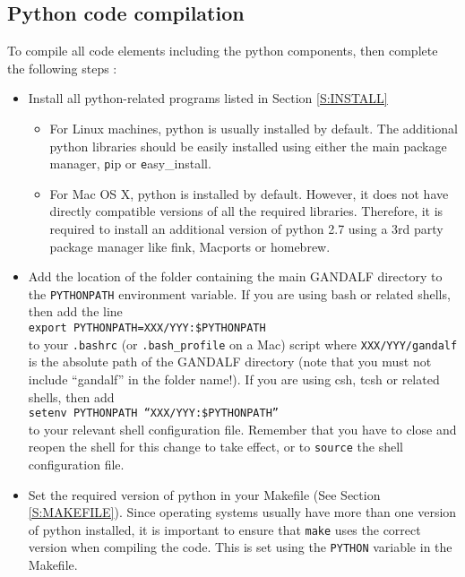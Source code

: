 \documentclass[a4paper]{article}
\newcommand{\var}[1]{\texttt{#1}}
\begin{document}
\subsection{Python code compilation}
To compile all code elements including the python components, then complete the following steps :
\begin{itemize}

\item Install all python-related programs listed in Section \ref{S:INSTALL}

\begin{itemize}
\item For Linux machines, python is usually installed by default.  The additional python libraries should be easily installed using either the main package manager,  {\var pip} or {\var easy\_install}.
\item For Mac OS X, python is installed by default.  However, it does not have directly compatible versions of all the required libraries.  Therefore, it is required to install an additional version of python 2.7 using a 3rd party package manager like fink, Macports or homebrew.
\end{itemize}

\item Add the location of the folder containing the main GANDALF directory to the \var{PYTHONPATH} environment variable.  If you are using bash or related shells, then add the line \\
\newline
\noindent \var{export PYTHONPATH=XXX/YYY:\$PYTHONPATH} \\

\noindent to your \var{.bashrc} (or \var{.bash\_profile} on a Mac) script where \var{XXX/YYY/gandalf} is the absolute path of the GANDALF directory (note that you must not include ``gandalf'' in the folder name!). If you are using csh, tcsh or related shells, then add \\
\newline
\noindent \var{setenv PYTHONPATH ``XXX/YYY:\$PYTHONPATH''} \\

\noindent to your relevant shell configuration file. Remember that you have to close and reopen the shell for this change to take effect, or to \var{source} the shell configuration file.

\item Set the required version of python in your Makefile (See Section \ref{S:MAKEFILE}).  Since operating systems usually have more than one version of python installed, it is important to ensure that \var{make} uses the correct version when compiling the code.  This is set using the \var{PYTHON} variable in the Makefile.


\end{itemize}
\end{document}
